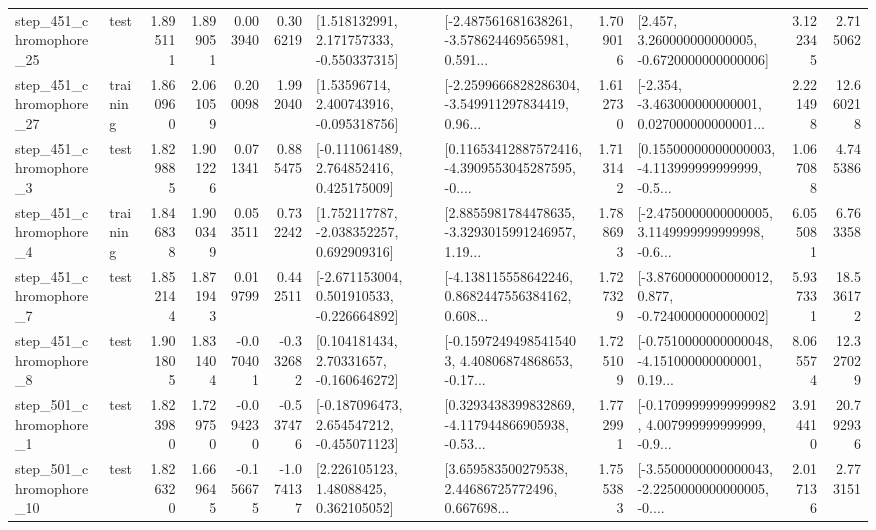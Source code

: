 \begin{tabular}{llrrrrllrlrr}
  step\_451\_chromophore\_25 &      test &      1.895111 &    1.899051 &      0.003940 &  0.306219 &    [1.518132991, 2.171757333, -0.550337315] &  [-2.487561681638261, -3.578624469565981, 0.591... &       1.709016 &    [2.457, 3.260000000000005, -0.6720000000000006] &            3.122345 &          2.715062 \\
  step\_451\_chromophore\_27 &  training &      1.860960 &    2.061059 &      0.200098 &  1.992040 &     [1.53596714, 2.400743916, -0.095318756] &  [-2.2599666828286304, -3.549911297834419, 0.96... &       1.612730 &  [-2.354, -3.463000000000001, 0.027000000000001... &            2.221498 &         12.660218 \\
   step\_451\_chromophore\_3 &      test &      1.829885 &    1.901226 &      0.071341 &  0.885475 &    [-0.111061489, 2.764852416, 0.425175009] &  [0.11653412887572416, -4.3909553045287595, -0.... &       1.713142 &  [0.15500000000000003, -4.113999999999999, -0.5... &            1.067088 &          4.745386 \\
   step\_451\_chromophore\_4 &  training &      1.846838 &    1.900349 &      0.053511 &  0.732242 &    [1.752117787, -2.038352257, 0.692909316] &  [2.8855981784478635, -3.3293015991246957, 1.19... &       1.788693 &  [-2.4750000000000005, 3.1149999999999998, -0.6... &            6.055081 &          6.763358 \\
   step\_451\_chromophore\_7 &      test &      1.852144 &    1.871943 &      0.019799 &  0.442511 &   [-2.671153004, 0.501910533, -0.226664892] &  [-4.138115558642246, 0.8682447556384162, 0.608... &       1.727329 &  [-3.8760000000000012, 0.877, -0.7240000000000002] &            5.937331 &         18.536172 \\
   step\_451\_chromophore\_8 &      test &      1.901805 &    1.831404 &     -0.070401 & -0.332682 &     [0.104181434, 2.70331657, -0.160646272] &  [-0.15972494985415403, 4.40806874868653, -0.17... &       1.725109 &  [-0.7510000000000048, -4.151000000000001, 0.19... &            8.065574 &         12.327029 \\
   step\_501\_chromophore\_1 &      test &      1.823980 &    1.729750 &     -0.094230 & -0.537476 &   [-0.187096473, 2.654547212, -0.455071123] &  [0.3293438399832869, -4.117944866905938, -0.53... &       1.772991 &  [-0.17099999999999982, 4.007999999999999, -0.9... &            3.914410 &         20.792936 \\
  step\_501\_chromophore\_10 &      test &      1.826320 &    1.669645 &     -0.156675 & -1.074137 &      [2.226105123, 1.48088425, 0.362105052] &  [3.659583500279538, 2.44686725772496, 0.667698... &       1.755383 &  [-3.5500000000000043, -2.2250000000000005, -0.... &            2.017136 &          2.773151 \\

\end{tabular}
